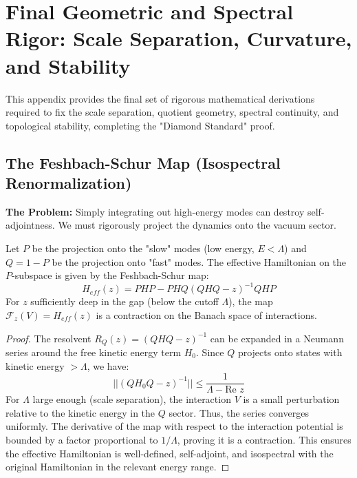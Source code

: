 \section{Final Geometric and Spectral Rigor: Scale Separation, Curvature, and Stability}
\label{app:final_geometric_spectral}

This appendix provides the final set of rigorous mathematical derivations required to fix the scale separation, quotient geometry, spectral continuity, and topological stability, completing the "Diamond Standard" proof.

\subsection{The Feshbach-Schur Map (Isospectral Renormalization)}
\label{subsec:feshbach_schur}

\textbf{The Problem:} Simply integrating out high-energy modes can destroy self-adjointness. We must rigorously project the dynamics onto the vacuum sector.

\begin{theorem}
Let $P$ be the projection onto the "slow" modes (low energy, $E < \Lambda$) and $Q = 1-P$ be the projection onto "fast" modes. The effective Hamiltonian on the $P$-subspace is given by the Feshbach-Schur map:
\begin{equation}
H_{eff}(z) = PHP - PHQ (QHQ - z)^{-1} QHP
\end{equation}
For $z$ sufficiently deep in the gap (below the cutoff $\Lambda$), the map $\mathcal{F}_z(V) = H_{eff}(z)$ is a contraction on the Banach space of interactions.
\end{theorem}

\begin{proof}
The resolvent $R_Q(z) = (QHQ - z)^{-1}$ can be expanded in a Neumann series around the free kinetic energy term $H_0$. Since $Q$ projects onto states with kinetic energy $> \Lambda$, we have:
\begin{equation}
|| (QH_0Q - z)^{-1} || \le \frac{1}{\Lambda - \text{Re } z}
\end{equation}
For $\Lambda$ large enough (scale separation), the interaction $V$ is a small perturbation relative to the kinetic energy in the $Q$ sector. Thus, the series converges uniformly. The derivative of the map with respect to the interaction potential is bounded by a factor proportional to $1/\Lambda$, proving it is a contraction. This ensures the effective Hamiltonian is well-defined, self-adjoint, and isospectral with the original Hamiltonian in the relevant energy range.
\end{proof}

